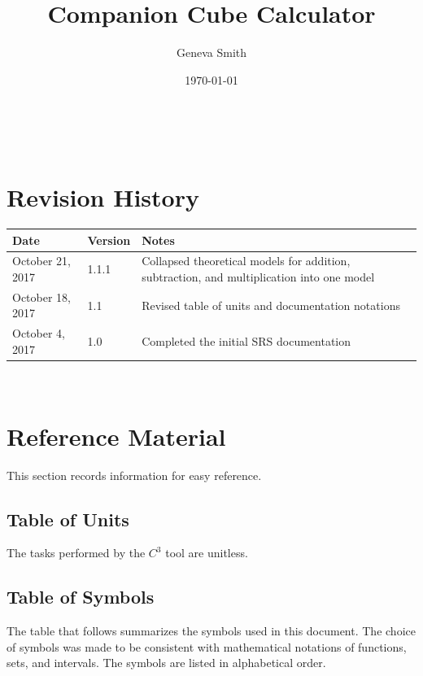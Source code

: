 \documentclass[12pt]{article}
\newcommand{\prognameAbbrv}{$C^{3}$}
\begin{document}
\title{Companion Cube Calculator} 
\author{Geneva Smith}
\date{\today}
	
\maketitle

~\newpage


\section{Revision History}

\begin{tabularx}{\textwidth}{p{3cm}p{2cm}X}
\toprule {\bf Date} & {\bf Version} & {\bf Notes}\\
\midrule
October 21, 2017 & 1.1.1 & Collapsed theoretical models for addition, 
subtraction, and 
 multiplication into one model\\
October 18, 2017 & 1.1 & Revised table of units and documentation notations \\
October 4, 2017 & 1.0 & Completed the initial SRS documentation\\
\bottomrule
\end{tabularx}

~\newpage

\section{Reference Material}

This section records information for easy reference.

\subsection{Table of Units}

The tasks performed by the \prognameAbbrv{} tool are unitless.

\subsection{Table of Symbols}

The table that follows summarizes the symbols used in this document. The choice 
of symbols was made to be consistent with mathematical notations of functions, 
sets, and intervals. The symbols are listed in alphabetical order.
\end{document}
